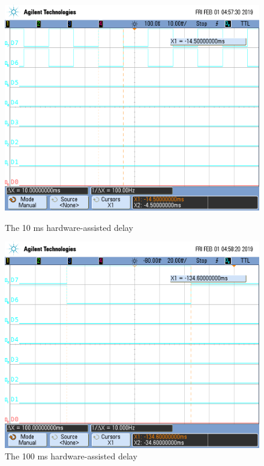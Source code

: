 \documentclass[a4paper, 12pt]{article}
\begin{document}
\begin{figure}[p]
\centering
\includegraphics[width=.8\textwidth]{10ms_hardware.png}
\caption{The 10 ms hardware-assisted delay}
\includegraphics[width=.8\textwidth]{100ms_hardware.png}
\caption{The 100 ms hardware-assisted delay}
\end{figure}
\end{document}
